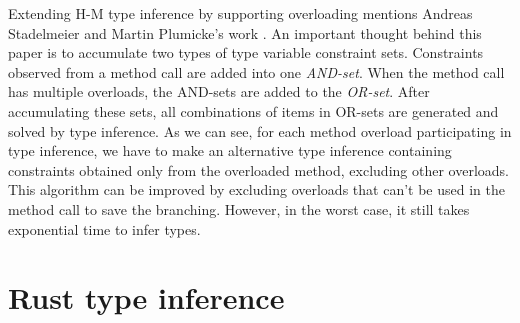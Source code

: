 \par
{}
Extending H-M type inference by supporting overloading mentions Andreas Stadelmeier and Martin Plumicke's work \cite{paper:Overloading}.
An important thought behind this paper is to accumulate two types of type variable constraint sets.
Constraints observed from a method call are added into one \textit{AND-set}.
When the method call has multiple overloads, the AND-sets are added to the \textit{OR-set}.
After accumulating these sets, all combinations of items in OR-sets are generated and solved by type inference.
As we can see, for each method overload participating in type inference, we have to make an alternative type inference containing constraints obtained only from the overloaded method, excluding other overloads.
This algorithm can be improved by excluding overloads that can't be used in the method call to save the branching.
However, in the worst case, it still takes exponential time to infer types.

\section{Rust type inference}

